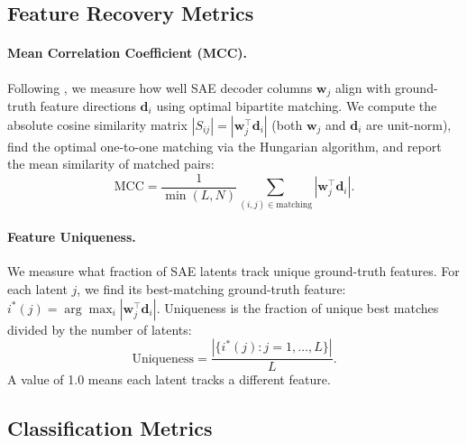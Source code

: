 \documentclass{article}
\theoremstyle{plain}
\theoremstyle{definition}
\theoremstyle{remark}
\begin{document}

\subsection{Feature Recovery Metrics}

\paragraph{Mean Correlation Coefficient (MCC).} Following \citet{song2025position}, we measure how well SAE decoder columns $\mathbf{w}_j$ align with ground-truth feature directions $\mathbf{d}_i$ using optimal bipartite matching. We compute the absolute cosine similarity matrix $|S_{ij}| = |\mathbf{w}_j^\top \mathbf{d}_i|$ (both $\mathbf{w}_j$ and $\mathbf{d}_i$ are unit-norm), find the optimal one-to-one matching via the Hungarian algorithm, and report the mean similarity of matched pairs:
\begin{equation}
\text{MCC} = \frac{1}{\min(L, N)} \sum_{(i,j) \in \text{matching}} |\mathbf{w}_j^\top \mathbf{d}_i|.
\end{equation}

\paragraph{Feature Uniqueness.} We measure what fraction of SAE latents track unique ground-truth features. For each latent $j$, we find its best-matching ground-truth feature: $i^*(j) = \arg\max_i |\mathbf{w}_j^\top \mathbf{d}_i|$. Uniqueness is the fraction of unique best matches divided by the number of latents:
\begin{equation}
\text{Uniqueness} = \frac{|\{i^*(j) : j = 1, \ldots, L\}|}{L}.
\end{equation}
A value of 1.0 means each latent tracks a different feature.

\subsection{Classification Metrics}
\end{document}
